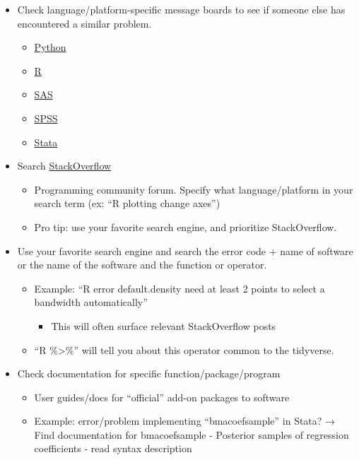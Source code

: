 \documentclass[
]{book}
\providecommand{\tightlist}{%
  \setlength{\itemsep}{0pt}\setlength{\parskip}{0pt}}
\begin{document}
\begin{itemize}
\tightlist
\item
  Check language/platform-specific message boards to see if someone else has encountered a similar problem.

  \begin{itemize}
  \tightlist
  \item
    \href{https://discuss.python.org/c/help/7}{Python}
  \item
    \href{https://forum.posit.co/}{R}
  \item
    \href{https://communities.sas.com/}{SAS}
  \item
    \href{https://www.ibm.com/products/spss-statistics/support}{SPSS}
  \item
    \href{https://www.statalist.org/}{Stata}
  \end{itemize}
\item
  Search \href{https://stackoverflow.com/questions}{StackOverflow}

  \begin{itemize}
  \tightlist
  \item
    Programming community forum. Specify what language/platform in your search term (ex: ``R plotting change axes'')
  \item
    Pro tip: use your favorite search engine, and prioritize StackOverflow.
  \end{itemize}
\item
  Use your favorite search engine and search the error code + name of software or
  the name of the software and the function or operator.

  \begin{itemize}
  \tightlist
  \item
    Example: ``R error default.density need at least 2 points to select a bandwidth automatically''

    \begin{itemize}
    \tightlist
    \item
      This will often surface relevant StackOverflow posts
    \end{itemize}
  \item
    ``R \%\textgreater\%'' will tell you about this operator common to the tidyverse.
  \end{itemize}
\item
  Check documentation for specific function/package/program

  \begin{itemize}
  \tightlist
  \item
    User guides/docs for ``official'' add-on packages to software
  \item
    Example: error/problem implementing ``bmacoefsample'' in Stata? → Find documentation for bmacoefsample - Posterior samples of regression coefficients - read syntax description
  \end{itemize}
\end{itemize}
\end{document}
